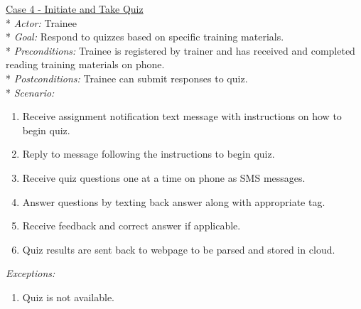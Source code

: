\underline{Case 4 - Initiate and Take Quiz}\\*
\textit{Actor:} Trainee\\*
\textit{Goal:} Respond to quizzes based on specific training materials.\\*
\textit{Preconditions:} Trainee is registered by trainer and has received and completed reading training materials on phone.\\*
\textit{Postconditions:} Trainee can submit responses to quiz.\\*
\textit{Scenario:}
\begin{enumerate}
	\item{Receive assignment notification text message with instructions on how to begin quiz.}
	\item{Reply to message following the instructions to begin quiz.}
	\item{Receive quiz questions one at a time on phone as SMS messages.}
	\item{Answer questions by texting back answer along with appropriate tag.}
	\item{Receive feedback and correct answer if applicable.}
	\item{Quiz results are sent back to webpage to be parsed and stored in cloud.}
\end{enumerate}
\textit{Exceptions:}
\begin{enumerate}
	\item{Quiz is not available.}
\end{enumerate}